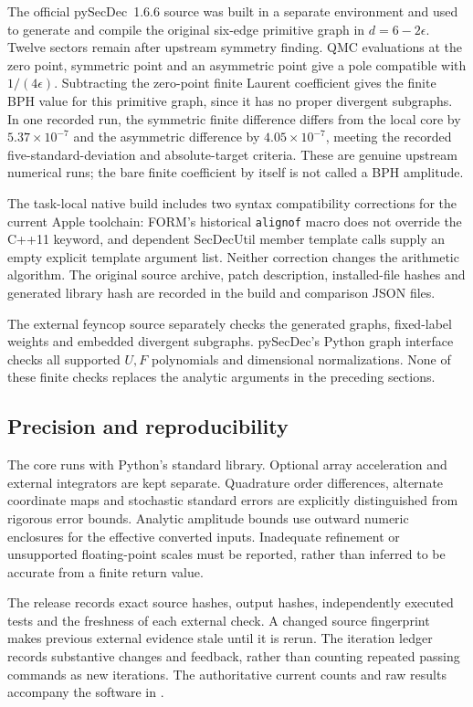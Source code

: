 The official pySecDec~1.6.6 source was built in a separate environment and
used to generate and compile the original six-edge primitive graph in
$d=6-2\epsilon$. Twelve sectors remain after upstream symmetry finding.
QMC evaluations at the zero point, symmetric point and an asymmetric point
give a pole compatible with $1/(4\epsilon)$. Subtracting the zero-point
finite Laurent coefficient gives the finite BPH value for this primitive
graph, since it has no proper divergent subgraphs. In one recorded run,
the symmetric finite difference differs from the local core by
$5.37\times10^{-7}$ and the asymmetric difference by
$4.05\times10^{-7}$, meeting the recorded five-standard-deviation and
absolute-target criteria. These
are genuine upstream numerical runs; the bare finite coefficient by itself
is not called a BPH amplitude.

The task-local native build includes two syntax compatibility corrections
for the current Apple toolchain: FORM's historical \texttt{alignof} macro
does not override the C++11 keyword, and dependent SecDecUtil member
template calls supply an empty explicit template argument list. Neither
correction changes the arithmetic algorithm. The original source archive,
patch description, installed-file hashes and generated library hash are
recorded in the build and comparison JSON files.

The external feyncop source separately checks the generated graphs,
fixed-label weights and embedded divergent subgraphs. pySecDec's Python
graph interface checks all supported $U,F$ polynomials and dimensional
normalizations. None of these finite checks replaces the analytic arguments
in the preceding sections.

\subsection{Precision and reproducibility}
The core runs with Python's standard library. Optional array acceleration
and external integrators are kept separate. Quadrature order differences,
alternate coordinate maps and stochastic standard errors are explicitly
distinguished from rigorous error bounds. Analytic amplitude bounds use
outward numeric enclosures for the effective converted inputs. Inadequate
refinement or unsupported floating-point scales must be reported, rather
than inferred to be accurate from a finite return value.

The release records exact source hashes, output hashes, independently
executed tests and the freshness of each external check. A changed source
fingerprint makes previous external evidence stale until it is rerun. The
iteration ledger records substantive changes and feedback, rather than
counting repeated passing commands as new iterations. The authoritative
current counts and raw results accompany the software in .

